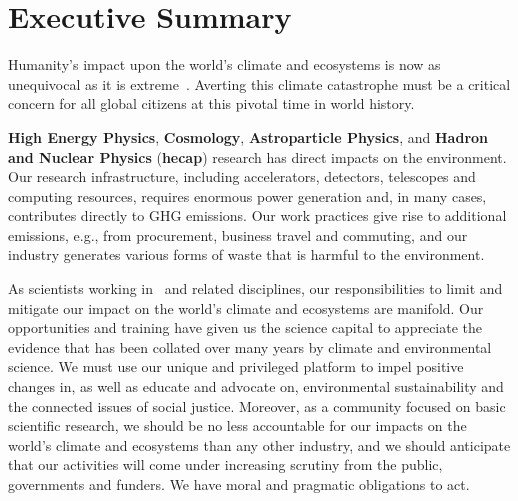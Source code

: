 \documentclass[../SustainableHEP.tex]{subfiles}
\begin{document}
\RaggedRight
\sloppy
\newpage


\section*{Executive Summary}
\label{sec:Executive_Summary}

Humanity's impact upon the world's climate and ecosystems is now as unequivocal as it is extreme~\cite{IPCC2021reportSPM}. Averting this climate catastrophe 
must be a critical concern for all global citizens at this pivotal time in world history.

\textbf{High Energy Physics}, \textbf{Cosmology}, \textbf{Astroparticle Physics}, and \textbf{Hadron and Nuclear Physics} (\textbf{\acrshort{hecap}}) research has direct impacts on the environment.  Our research infrastructure, including accelerators, detectors, telescopes and computing resources, requires enormous power generation and, in many cases, contributes directly to GHG emissions. Our work practices give rise to additional emissions, e.g., from procurement, business travel and commuting, and our industry generates various forms of waste that is harmful to the environment.

As scientists working in \ACR\ and related disciplines, our responsibilities to limit and mitigate our impact on the world's climate and ecosystems are manifold. Our opportunities and training have given us the science capital to appreciate the evidence that has been collated over many years by climate and environmental science. We must use our unique and privileged platform to impel positive changes in, as well as educate and advocate on, environmental sustainability and the connected issues of social justice. Moreover, as a community focused on basic scientific research, we should be no less accountable for our impacts on the world's climate and ecosystems than any other industry, and we should anticipate that our activities will come under increasing scrutiny from the public, governments and funders. We have moral and pragmatic obligations to act.
\end{document}
